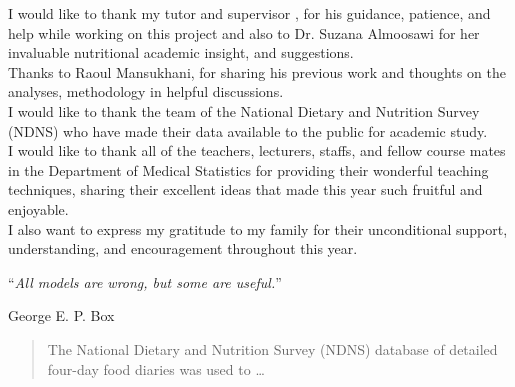 \documentclass[
12pt, %
english, %
singlespacing, %
headsepline, %
]{MastersDoctoralThesis} %
\begin{document}
\begin{acknowledgements}
\addchaptertocentry{\acknowledgementname} %

I would like to thank my tutor and supervisor \supname, for his guidance, patience, and help while working on this project and also to Dr. Suzana Almoosawi for her invaluable nutritional academic insight, and suggestions. \\

Thanks to Raoul Mansukhani, for sharing his previous work and thoughts on the analyses, methodology in helpful discussions.	 \\

I would like to thank the team of the National Dietary and Nutrition Survey (NDNS) who have made their data available to the public for academic study. \\

I would like to thank all of the teachers, lecturers, staffs, and fellow course mates in the Department of Medical Statistics for providing their wonderful teaching techniques, sharing their excellent ideas that made this year such fruitful and enjoyable.\\


I also want to express my gratitude to my family for their unconditional support, understanding, and encouragement throughout this year. \\

\end{acknowledgements}


\cleardoublepage


\vspace*{0.2\textheight}

\noindent\enquote{\itshape All models are wrong, but some are useful.}\bigbreak

\hfill George E. P. Box


\begin{abstract}
\addchaptertocentry{\abstractname} %
The National Dietary and Nutrition Survey (NDNS) database of detailed four-day food diaries was used to \dots
\end{abstract}
\end{document}
